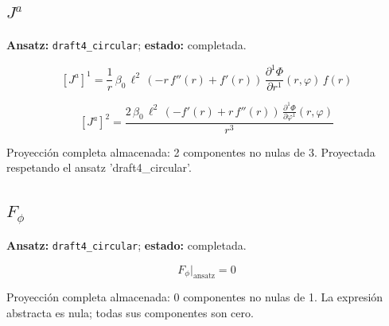 \documentclass[11pt]{article}
\begin{document}
\subsection*{$ J^a $}
\textbf{Ansatz:} \texttt{draft4\_circular}; \textbf{estado:} completada.\par
\begin{dmath*}[breakdepth={5}]
\left[J^a\right]^{1} = \frac{1}{r}\,\beta_{0}\,{\ell}^{2}\,\left(-r\,f''\!\left(r\right) + f'\!\left(r\right)\right)\,\frac{\partial^{1} \Phi}{\partial r^{1}}\!\left(r, \varphi\right)\,f\!\left(r\right)
\end{dmath*}
\par\smallskip
\begin{dmath*}[breakdepth={5}]
\left[J^a\right]^{2} = \frac{2\,\beta_{0}\,{\ell}^{2}\,\left(-f'\!\left(r\right) + r\,f''\!\left(r\right)\right)\,\frac{\partial^{1} \Phi}{\partial \varphi^{1}}\!\left(r, \varphi\right)}{{r}^{3}}
\end{dmath*}
\par\smallskip
Proyección completa almacenada: 2 componentes no nulas de 3. Proyectada respetando el ansatz 'draft4\_circular'.\par\medskip
{}
\subsection*{$ F_{\phi} $}
\textbf{Ansatz:} \texttt{draft4\_circular}; \textbf{estado:} completada.\par
\begin{dmath*}[breakdepth={5}]
F_{\phi}\big|_{\mathrm{ansatz}} = 0
\end{dmath*}
\par\smallskip
Proyección completa almacenada: 0 componentes no nulas de 1. La expresión abstracta es nula; todas sus componentes son cero.\par\medskip
{}
\end{document}

